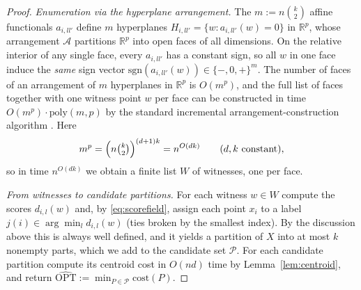 \documentclass{amsart}
\theoremstyle{plain}
\theoremstyle{definition}
\newcommand{\R}{\mathbb{R}}
\begin{document}
\begin{proof}
\emph{Enumeration via the hyperplane arrangement.} The $m:=n\binom{k}{2}$ affine
functionals $a_{i,ll'}$ define $m$ hyperplanes $H_{i,ll'}=\{w:a_{i,ll'}(w)=0\}$ in
$\R^{p}$, whose arrangement $\mathcal A$ partitions $\R^{p}$ into open faces of all
dimensions. On the relative interior of any single face, every $a_{i,ll'}$ has a
constant sign, so all $w$ in one face induce the \emph{same} sign vector
$\mathrm{sgn}(a_{i,ll'}(w))\in\{-,0,+\}^{m}$. The number of faces of an arrangement
of $m$ hyperplanes in $\R^{p}$ is $O(m^{p})$, and the full list of faces together
with one witness point $w$ per face can be constructed in time
$O(m^{p})\cdot\mathrm{poly}(m,p)$ by the standard incremental
arrangement-construction algorithm \cite{EOS}. Here
\[
m^{p}=\Big(n\tbinom{k}{2}\Big)^{(d+1)k}=n^{O(dk)}\qquad(d,k\ \text{constant}),
\]
so in time $n^{O(dk)}$ we obtain a finite list $W$ of witnesses, one per face.

\emph{From witnesses to candidate partitions.} For each witness $w\in W$ compute
the scores $d_{i,l}(w)$ and, by \eqref{eq:scorefield}, assign each point $x_i$ to a
label $j(i)\in\arg\min_l d_{i,l}(w)$ (ties broken by the smallest index). By the
discussion above this is always well defined, and it yields a partition of $X$ into
at most $k$ nonempty parts, which we add to the candidate set $\mathcal P$. For each
candidate partition compute its centroid cost in $O(nd)$ time by
Lemma~\ref{lem:centroid}, and return $\widehat{\mathrm{OPT}}:=\min_{P\in\mathcal P}
\mathrm{cost}(P)$.


\end{proof}
\end{document}
